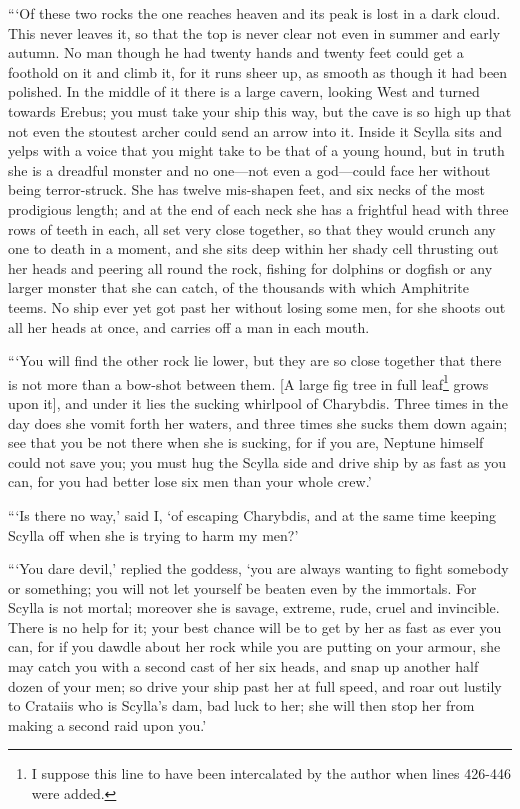 “‘Of these two rocks the one reaches heaven and its peak is lost in a dark
cloud. This never leaves it, so that the top is never clear not even in summer
and early autumn. No man though he had twenty hands and twenty feet could get a
foothold on it and climb it, for it runs sheer up, as smooth as though it had
been polished. In the middle of it there is a large cavern, looking West and
turned towards Erebus; you must take your ship this way, but the cave is so
high up that not even the stoutest archer could send an arrow into it. Inside
it Scylla sits and yelps with a voice that you might take to be that of a young
hound, but in truth she is a dreadful monster and no one—not even a god—could
face her without being terror-struck. She has twelve mis-shapen feet, and six
necks of the most prodigious length; and at the end of each neck she has a
frightful head with three rows of teeth in each, all set very close together,
so that they would crunch any one to death in a moment, and she sits deep
within her shady cell thrusting out her heads and peering all round the rock,
fishing for dolphins or dogfish or any larger monster that she can catch, of
the thousands with which Amphitrite teems. No ship ever yet got past her
without losing some men, for she shoots out all her heads at once, and carries
off a man in each mouth.

“‘You will find the other rock lie lower, but they are so close together that
there is not more than a bow-shot between them. [A large fig tree in full
leaf\footnote{I suppose this line to have been intercalated by the author when lines
426-446 were added.} grows
upon it], and under it lies the sucking whirlpool of Charybdis. Three times in
the day does she vomit forth her waters, and three times she sucks them down
again; see that you be not there when she is sucking, for if you are, Neptune
himself could not save you; you must hug the Scylla side and drive ship by as
fast as you can, for you had better lose six men than your whole crew.’

“‘Is there no way,’ said I, ‘of escaping Charybdis, and at the same time
keeping Scylla off when she is trying to harm my men?’

“‘You dare devil,’ replied the goddess, ‘you are always wanting to fight
somebody or something; you will not let yourself be beaten even by the
immortals. For Scylla is not mortal; moreover she is savage, extreme, rude,
cruel and invincible. There is no help for it; your best chance will be to get
by her as fast as ever you can, for if you dawdle about her rock while you are
putting on your armour, she may catch you with a second cast of her six heads,
and snap up another half dozen of your men; so drive your ship past her at full
speed, and roar out lustily to Crataiis who is Scylla’s dam, bad luck to her;
she will then stop her from making a second raid upon you.’

